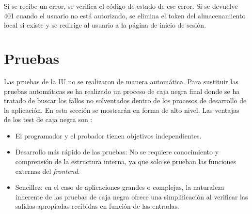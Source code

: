 Si se recibe un error, se verifica el código de estado de ese error. Si se devuelve 401 cuando el usuario no está autorizado, se elimina el token del almacenamiento local si existe y se redirige al usuario a la página de inicio de sesión.



\section{Pruebas}
Las pruebas de la IU no se realizaron de manera automática. Para sustituir las pruebas automáticas se ha realizado un proceso de caja negra final donde se ha tratado de buscar los fallos no solventados dentro de los procesos de desarrollo de la aplicación. En esta sección se mostrarán en forma de alto nivel. Las ventajas de los test de caja negra son :

\begin{itemize}
\item El programador y el probador tienen objetivos independientes.
\item Desarrollo más rápido de las pruebas: No se requiere conocimiento y comprensión de la estructura interna, ya que solo se prueban las funciones externas del \textit{frontend}.
\item Sencillez: en el caso de aplicaciones grandes o complejas, la naturaleza inherente de las pruebas de caja negra ofrece una simplificación al verificar las salidas apropiadas recibidas en función de las entradas.
\end{itemize}

